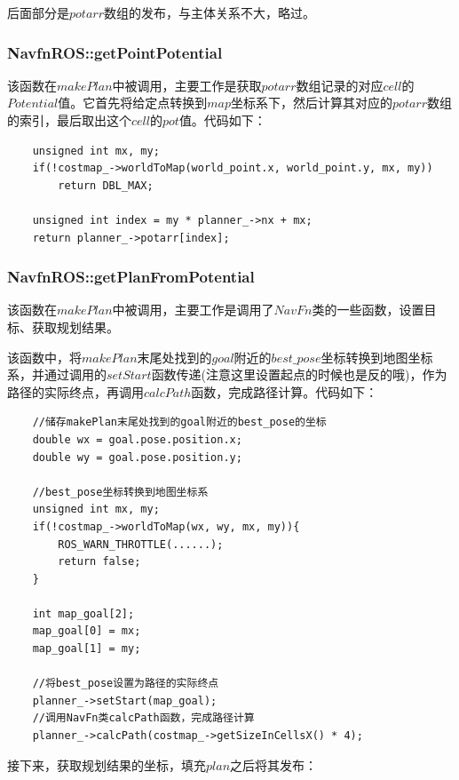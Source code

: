 \documentclass[9pt, oneside]{book}
\begin{document}
后面部分是$potarr$数组的发布，与主体关系不大，略过。

\subsubsection{NavfnROS::getPointPotential}

该函数在$makePlan$中被调用，主要工作是获取$potarr$数组记录的对应$cell$的$Potential$值。它首先将给定点转换到$map$坐标系下，然后计算其对应的$potarr$数组的索引，最后取出这个$cell$的$pot$值。代码如下：

\begin{verbatim}
    unsigned int mx, my;
    if(!costmap_->worldToMap(world_point.x, world_point.y, mx, my))
        return DBL_MAX;

    unsigned int index = my * planner_->nx + mx;
    return planner_->potarr[index];
\end{verbatim}

\subsubsection{NavfnROS::getPlanFromPotential}

该函数在$makePlan$中被调用，主要工作是调用了$NavFn$类的一些函数，设置目标、获取规划结果。

该函数中，将$makePlan$末尾处找到的$goal$附近的$best\_pose$坐标转换到地图坐标系，并通过调用的$setStart$函数传递(注意这里设置起点的时候也是反的哦)，作为路径的实际终点，再调用$calcPath$函数，完成路径计算。代码如下：

\begin{verbatim}
    //储存makePlan末尾处找到的goal附近的best_pose的坐标
    double wx = goal.pose.position.x;
    double wy = goal.pose.position.y;

    //best_pose坐标转换到地图坐标系
    unsigned int mx, my;
    if(!costmap_->worldToMap(wx, wy, mx, my)){
        ROS_WARN_THROTTLE(......);
        return false;
    }

    int map_goal[2];
    map_goal[0] = mx;
    map_goal[1] = my;

    //将best_pose设置为路径的实际终点
    planner_->setStart(map_goal);
    //调用NavFn类calcPath函数，完成路径计算
    planner_->calcPath(costmap_->getSizeInCellsX() * 4);
\end{verbatim}

接下来，获取规划结果的坐标，填充$plan$之后将其发布：
\end{document}
